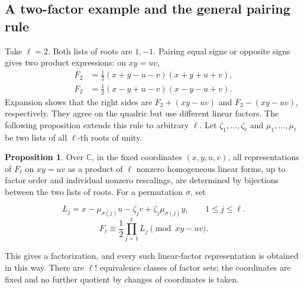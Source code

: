 \documentclass[a4paper,11pt]{article}
\theoremstyle{definition}
\newtheorem{proposition}{Proposition}[section]
\newcommand{\C}{\mathbb C}
\begin{document}
\subsection{A two-factor example and the general pairing rule}
Take \(\ell=2\). Both lists of roots are \(1,-1\).
Pairing equal signs or opposite signs gives two product expressions:
on \(xy=uv\),
\[
 \begin{aligned}
 F_2&=\tfrac12(x+y-u-v)(x+y+u+v),\\
 F_2&=\tfrac12(x-y+u-v)(x-y-u+v).
 \end{aligned}
\]
Expansion shows that the right sides are \(F_2+(xy-uv)\) and
\(F_2-(xy-uv)\), respectively. They agree on the quadric but use
different linear factors. The following proposition extends this rule
to arbitrary \(\ell\).
Let \(\zeta_1,\ldots,\zeta_\ell\) and
\(\mu_1,\ldots,\mu_\ell\) be two lists of all \(\ell\)-th roots of unity.
\begin{proposition}\label{prop:pairings}
Over \(\C\), in the fixed coordinates \((x,y,u,v)\), all representations of
\(F_\ell\) on \(xy=uv\) as a product of \(\ell\) nonzero
homogeneous linear forms, up to factor order and individual nonzero
rescalings, are determined by bijections between the two lists of roots.
For a permutation \(\sigma\), set

\begin{equation}\label{eq:pairingforms}
 L_j=x-\mu_{\sigma(j)}u-\zeta_jv
       +\zeta_j\mu_{\sigma(j)}y,\qquad 1\leq j\leq\ell.
\end{equation}
\begin{equation}\label{eq:pairingproduct}
 F_\ell\equiv\frac12\prod_{j=1}^{\ell}L_j\pmod{xy-uv}.
\end{equation}

This gives a factorization, and every such linear-factor representation
is obtained in this way. There are \(\ell!\) equivalence classes
of factor sets; the coordinates are fixed and no further quotient
by changes of coordinates is taken.
\end{proposition}
\end{document}
